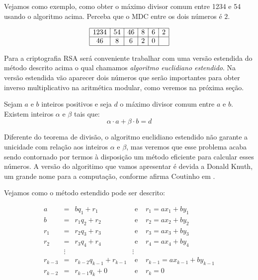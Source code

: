 Vejamos como exemplo, como obter o m\'{a}ximo divisor comum entre 1234 e 54 usando o algoritmo acima. Perceba que o MDC entre os dois n\'umeros \'e $2$.

\[
\begin{array}{|c|c|c|c|c|c|}\hline
	1234 & 54 & 46 & 8 & 6 & 2 \\ \hline
	46   & 8  & 6  & 2 & 0 &   \\ \hline
\end{array}
\]

Para a criptografia RSA ser\'{a} conveniente trabalhar com uma vers\~ao estendida do m\'etodo descrito acima o qual 
chamamos \textit{algoritmo euclidiano estendido}.
Na vers\~{a}o estendida v\~{a}o aparecer dois n\'{u}meros que ser\~{a}o importantes para obter inverso multiplicativo 
na aritm\'{e}tica modular, como veremos na pr\'{o}xima se\c{c}\~{a}o.


\begin{Th}\label{alg.eucl.est.}
Sejam $a$ e $b$ inteiros positivos e seja $d$ o m\'aximo divisor comum entre $a$ e $b$. Existem
inteiros $\alpha$ e $\beta$ tais que:
	$$\alpha\cdot a+\beta\cdot b=d$$
\end{Th}


Diferente do teorema de divis\~ao, o algoritmo euclidiano estendido n\~ao garante a unicidade 
com rela\c{c}\~ao aos inteiros $\alpha$ e $\beta$, mas veremos que esse problema acaba sendo 
contornado por termos \`{a} disposi\c{c}\~ao um m\'etodo eficiente para calcular esses n\'umeros.
A vers\~{a}o do algoritimo que vamos apresentar \'{e} devida a Donald Knuth, um grande nome 
para a computa\c{c}\~{a}o, conforme afirma Coutinho em \cite{cou:2014}.

Vejamos como o m\'{e}todo estendido pode ser descrito:

\[
\begin{array}{rclcl}
a   		& =      & bq_{1}+r_{1} 			    & \textrm{ e } & r_{1}=ax_{1}+by_{1}       \\
b   		& =      & r_{1}q_{2}+r_{2} 	    & \textrm{ e } & r_{2}=ax_{2}+by_{2}     \\
r_{1}		& =      & r_{2}q_{3}+r_{3} 	    & \textrm{ e } & r_{3}=ax_{3}+by_{3}     \\
r_{2}   & =      & r_{3}q_{4}+r_{4} 	    & \textrm{ e } & r_{4}=ax_{4}+by_{4}     \\
        & \vdots &     		          	    &  \vdots      &                     \\
r_{k-3} & =      & r_{k-2}q_{k-1}+r_{k-1} & \textrm{ e } & r_{k-1}=ax_{k-1}+by_{k-1} \\				
r_{k-2} & =      & r_{k-1}q_{k}+ 0        & \textrm{ e } & r_{k}=0 \\		
\end{array}
\]

